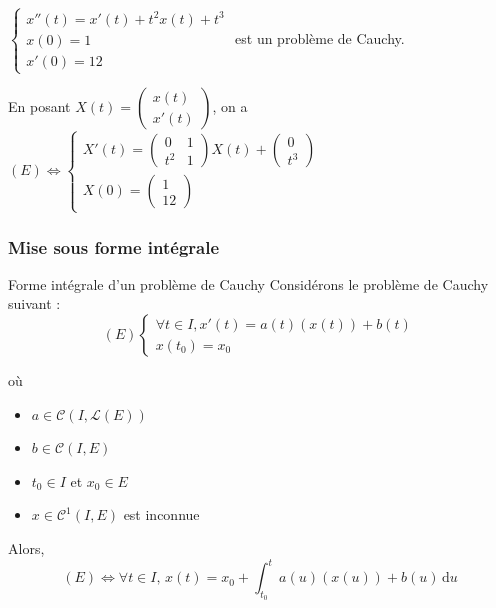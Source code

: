 \begin{exemple}
    $\begin{cases}
        x''(t) = x'(t) + t^2 x(t) + t^3\\
        x(0) = 1 \\
        x'(0) = 12
    \end{cases}$ est un problème de Cauchy. 

    En posant $X(t) = \begin{pmatrix}
        x(t) \\ x'(t)
    \end{pmatrix}$, on a $(E) \Leftrightarrow \begin{cases} 
        X'(t) = \begin{pmatrix}
            0 & 1 \\ 
            t^2 & 1
        \end{pmatrix} X(t) + \begin{pmatrix}
            0 \\ t^3
        \end{pmatrix} \\ 
        X(0) = \begin{pmatrix}
            1 \\ 12
        \end{pmatrix}
    \end{cases}$
\end{exemple}

\subsubsection{Mise sous forme intégrale}

\begin{proposition}{Forme intégrale d'un problème de Cauchy}{}
    Considérons le problème de Cauchy suivant :
    $$(E) \begin{cases}
        \forall t \in I, x'(t) = a(t)(x(t)) + b(t) \\
        x(t_0) = x_0
    \end{cases}$$

    où 
    \begin{itemize}
        \item $a \in \mathscr C(I, \mathscr L(E))$
        \item $b \in \mathscr C(I, E)$
        \item $t_0 \in I$ et $x_0 \in E$
        \item $x \in \mathscr C^1(I, E)$ est inconnue
    \end{itemize}

    Alors, 
    $$(E) \Leftrightarrow \forall t \in I, \, x(t) = x_0 + \int_{t_0}^{t} a(u)(x(u)) + b(u) \, \mathrm d u$$
\end{proposition}

